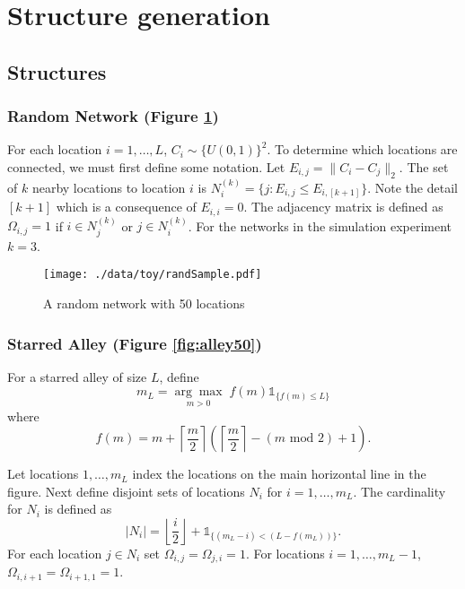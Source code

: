 \documentclass[11pt]{article}
\begin{document}
\section{Structure generation}
\label{sec-3}

\subsection{Structures}
\label{sec-3-1}

\subsubsection{Random Network (Figure \ref{fig:rand50})}
\label{sec-3-1-1}

For each location $i=1,\ldots,L$, $C_i \sim \lbrace U(0,1)\rbrace^2$.
To determine which locations are connected, we must first define some
notation.  Let $E_{i,j} = \|C_{i} - C_{j}\|_2$.  The set of $k$ nearby
locations to location $i$ is $N^{(k)}_i = \lbrace j : E_{i,j} \le
    E_{i,[k+1]} \rbrace$.  Note the detail $[k+1]$ which is a consequence
of $E_{i,i} = 0$.  The adjacency matrix is defined as $\Omega_{i,j} =
    1$ if $i \in N_{j}^{(k)}$ or $j \in N_{i}^{(k)}$.  For the
networks in the simulation experiment $k = 3$.


\begin{figure}[htb]
\centering
\texttt{[image: ./data/toy/randSample.pdf]}
\caption{\label{fig:rand50}A random network with 50 locations}
\end{figure}



\subsubsection{Starred Alley (Figure \ref{fig:alley50})}
\label{sec-3-1-2}

For a starred alley of size $L$, define
\begin{equation*}
m_L= \underset{m > 0}{\arg\max} \; f(m) \mathds{1}_{\lbrace f(m) \le L
\rbrace }
\end{equation*}
where
\begin{equation*}
f(m) = m + \left\lceil \frac{m}{2}
\right\rceil 
\left(\left\lceil \frac{m}{2} \right\rceil
- (m \text{ mod } 2) + 1 \right).
\end{equation*}

Let locations $1,\ldots,m_L$ index the locations on the main
horizontal line in the figure.  Next define disjoint sets of
locations $N_i$ for $i = 1,\ldots,m_L$.  The cardinality for $N_i$
is defined as
\begin{equation*}
| N_i | = \left\lfloor \frac{i}{2} \right\rfloor +
\mathds{1}_{\lbrace(m_L - i) < (L - f(m_L))\rbrace}.
\end{equation*}
For each location $j \in N_i$ set $\Omega_{i,j} = \Omega_{j,i} =
    1$.  For locations $i = 1,\ldots,m_L - 1$, $\Omega_{i,i+1} =
    \Omega_{i+1,1} = 1$.
\end{document}
